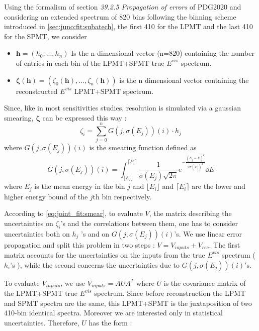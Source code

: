 \documentclass[../main.tex]{subfiles}
\begin{document}
Using the formalism of section \textit{39.2.5 Propagation of errors} of PDG2020 \cite{particle_data_group_review_2020} and considering an extended spectrum of 820 bins following the binning scheme introduced in \ref{sec:juno:fit:subatech}, the first 410 for the LPMT and the last 410 for the SPMT, we consider
\begin{itemize}
  \item $\bm{h} = (h_0, ..., h_n)$ Is the n-dimensional vector (n=820) containing the number of entries in each bin of the LPMT+SPMT true $E^{vis}$ spectrum.
  \item $\bm{\zeta}(\bm{h}) = (\zeta_0(\bm{h}), ..., \zeta_n(\bm{h}))$ is the n dimensional vector containing the reconstructed $E^{vis}$ LPMT+SPMT spectrum.
\end{itemize}

Since, like in most sensitivities studies, resolution is simulated via a gaussian smearing, $\bm{\zeta}$ can be expressed this way :
\begin{equation}
  \label{eq:joint_fit:cov_ana:eta}
  \zeta_i  = \sum_{j=0}^n G(j, \sigma(E_j))(i) \cdot h_j
\end{equation}
where $G(j, \sigma(E_j))(i)$ is the smearing function defined as
\begin{equation}
  \label{eq:joint_fit:smear}
  G(j, \sigma(E_j))(i) = \int_{\lfloor E_i\rfloor}^{\lceil E_i \rceil} \frac{1}{\sigma(E_j)\sqrt{2\pi}} e^{-\frac{(E_j-E)^2}{2\sigma(E_j)^2}} \dd{E}
\end{equation}
where $E_j$ is the mean energy in the bin $j$ and $\lfloor E_i\rfloor$ and $\lceil E_i \rceil$ are the lower and higher energy bound of the $j$th bin respectively.

According to \ref{eq:joint_fit:smear}, to evaluate $V$, the matrix describing the uncertainties on $\zeta_i$'s  and the correlations between them, one has to consider uncertainties both on $h_j$ 's and on $G(j,\sigma(E_j))(i)$'s. We use linear error propagation and split this problem in two steps : $V = V_{inputs} + V_{rec} $. The first matrix accounts for the uncertainties on the inputs from the true $E^{vis}$ spectrum ( $h_i$'s ), while the second concerns the uncertainties due to $G(j,\sigma(E_j))(i)'$s.

To evaluate $V_{inputs}$, we use $V_{inputs} = AUA^T$ where $U$ is the covariance matrix of the LPMT+SPMT true $E^{vis}$ spectrum.
Since before reconstruction the LPMT and SPMT spectra are the same, this LPMT+SPMT is the juxtaposition of two 410-bin identical spectra. Moreover we are interested only in statistical uncertainties. Therefore, $U$ has the form :
\end{document}
